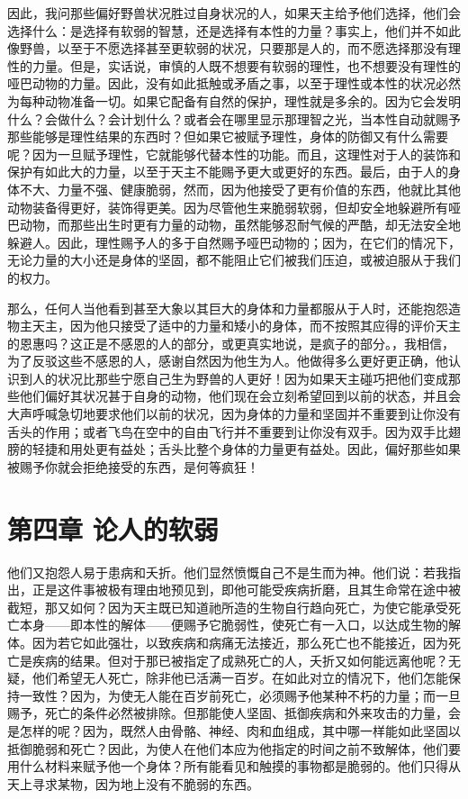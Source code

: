 因此，我问那些偏好野兽状况胜过自身状况的人，如果天主给予他们选择，他们会选择什么：是选择有软弱的智慧，还是选择有本性的力量？事实上，他们并不如此像野兽，以至于不愿选择甚至更软弱的状况，只要那是人的，而不愿选择那没有理性的力量。但是，实话说，审慎的人既不想要有软弱的理性，也不想要没有理性的哑巴动物的力量。因此，没有如此抵触或矛盾之事，以至于理性或本性的状况必然为每种动物准备一切。如果它配备有自然的保护，理性就是多余的。因为它会发明什么？会做什么？会计划什么？或者会在哪里显示那理智之光，当本性自动就赐予那些能够是理性结果的东西时？但如果它被赋予理性，身体的防御又有什么需要呢？因为一旦赋予理性，它就能够代替本性的功能。而且，这理性对于人的装饰和保护有如此大的力量，以至于天主不能赐予更大或更好的东西。最后，由于人的身体不大、力量不强、健康脆弱，然而，因为他接受了更有价值的东西，他就比其他动物装备得更好，装饰得更美。因为尽管他生来脆弱软弱，但却安全地躲避所有哑巴动物，而那些出生时更有力量的动物，虽然能够忍耐气候的严酷，却无法安全地躲避人。因此，理性赐予人的多于自然赐予哑巴动物的；因为，在它们的情况下，无论力量的大小还是身体的坚固，都不能阻止它们被我们压迫，或被迫服从于我们的权力。\par

那么，任何人当他看到甚至大象以其巨大的身体和力量都服从于人时，还能抱怨造物主天主，因为他只接受了适中的力量和矮小的身体，而不按照其应得的评价天主的恩惠吗？这正是不感恩的人的部分，或更真实地说，是疯子的部分。，我相信，为了反驳这些不感恩的人，感谢自然因为他生为人。他做得多么更好更正确，他认识到人的状况比那些宁愿自己生为野兽的人更好！因为如果天主碰巧把他们变成那些他们偏好其状况甚于自身的动物，他们现在会立刻希望回到以前的状态，并且会大声呼喊急切地要求他们以前的状况，因为身体的力量和坚固并不重要到让你没有舌头的作用；或者飞鸟在空中的自由飞行并不重要到让你没有双手。因为双手比翅膀的轻捷和用处更有益处；舌头比整个身体的力量更有益处。因此，偏好那些如果被赐予你就会拒绝接受的东西，是何等疯狂！\par


\section{第四章 论人的软弱}

他们又抱怨人易于患病和夭折。他们显然愤慨自己不是生而为神。他们说：若我指出，正是这件事被极有理由地预见到，即他可能受疾病折磨，且其生命常在途中被截短，那又如何？因为天主既已知道祂所造的生物自行趋向死亡，为使它能承受死亡本身——即本性的解体——便赐予它脆弱性，使死亡有一入口，以达成生物的解体。因为若它如此强壮，以致疾病和病痛无法接近，那么死亡也不能接近，因为死亡是疾病的结果。但对于那已被指定了成熟死亡的人，夭折又如何能远离他呢？无疑，他们希望无人死亡，除非他已活满一百岁。在如此对立的情况下，他们怎能保持一致性？因为，为使无人能在百岁前死亡，必须赐予他某种不朽的力量；而一旦赐予，死亡的条件必然被排除。但那能使人坚固、抵御疾病和外来攻击的力量，会是怎样的呢？因为，既然人由骨骼、神经、肉和血组成，其中哪一样能如此坚固以抵御脆弱和死亡？因此，为使人在他们本应为他指定的时间之前不致解体，他们要用什么材料来赋予他一个身体？所有能看见和触摸的事物都是脆弱的。他们只得从天上寻求某物，因为地上没有不脆弱的东西。\par


